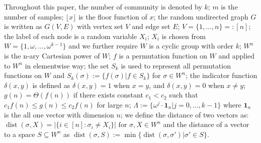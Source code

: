\documentclass[journal]{IEEEtran}
\DeclareMathOperator{\dist}{dist}
\begin{document}
Throughout this paper, the number of community is denoted by $k$; $m$ is the number of samples; $\lfloor x \rfloor$ is the floor function of $x$; the random undirected graph $G$ is written as $G(V,E)$ with vertex set $V$ and edge set $E$;
$V=\{1,\dots, n\} =: [n]$;
the label of each node is a random variable $X_i$; $X_i$ is chosen from $W= \{1, \omega, \dots, \omega^{k-1}\}$ and we further require $W$
is a cyclic group with order $k$; $W^n$ is the n-ary Cartesian power of $W$;
$f$ is a permutation function on $W$ and applied to $W^n$ in elementwise way;
the set $S_k$ is used to represent all permutation functions on $W$ and $S_k(\sigma):=\{f(\sigma)| f\in S_k\}$ for $\sigma \in W^n$;
the indicator function $\delta(x,y)$ is defined as
$\delta(x,y) = 1 $ when $x=y$, and $\delta(x,y)=0$ when $x\neq y$;
$g(n) = \Theta(f(n))$ if there exists constant $c_1 < c_2$ such that $c_1 f(n) \leq g(n) \leq c_2 f(n)$
for large $n$;
$\Lambda := \{ \omega^j  \cdot \mathbf{1}_n | j=0, \dots,k-1\}$
where $\mathbf{1}_n$ is the all one vector with dimension $n$;
we define the distance of two vectors as:
$\dist(\sigma, X)
=|\{i\in[n]:\sigma_i\neq X_i\}| \textrm{ for } \sigma,X\in W^n
$ and the distance of a vector to a space $S\subseteq W^n$
as
$\dist(\sigma,S)
:=\min\{\dist(\sigma, \sigma') | \sigma' \in S\}
$.
\end{document}
